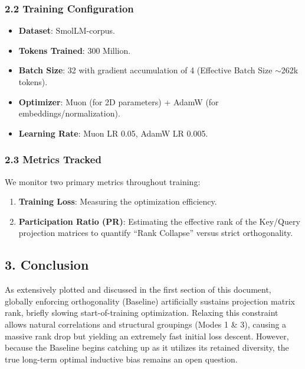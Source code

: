 \documentclass[12pt]{article}
\begin{document}
\subsubsection*{2.2 Training Configuration}
\begin{itemize}
    \item \textbf{Dataset}: SmolLM-corpus.
    \item \textbf{Tokens Trained}: 300 Million.
    \item \textbf{Batch Size}: 32 with gradient accumulation of 4 (Effective Batch Size $\sim$262k tokens).
    \item \textbf{Optimizer}: Muon (for 2D parameters) + AdamW (for embeddings/\-normalization).
    \item \textbf{Learning Rate}: Muon LR 0.05, AdamW LR 0.005.
\end{itemize}

\subsubsection*{2.3 Metrics Tracked}
We monitor two primary metrics throughout training:
\begin{enumerate}
    \item \textbf{Training Loss}: Measuring the optimization efficiency.
    \item \textbf{Participation Ratio (PR)}: Estimating the effective rank of the Key/Query projection matrices to quantify ``Rank Collapse'' versus strict orthogonality.
\end{enumerate}

\subsection*{3. Conclusion}

As extensively plotted and discussed in the first section of this document, globally enforcing orthogonality (Baseline) artificially sustains projection matrix rank, briefly slowing start-of-training optimization. Relaxing this constraint allows natural correlations and structural groupings (Modes 1 \& 3), causing a massive rank drop but yielding an extremely fast initial loss descent. However, because the Baseline begins catching up as it utilizes its retained diversity, the true long-term optimal inductive bias remains an open question.
\end{document}
